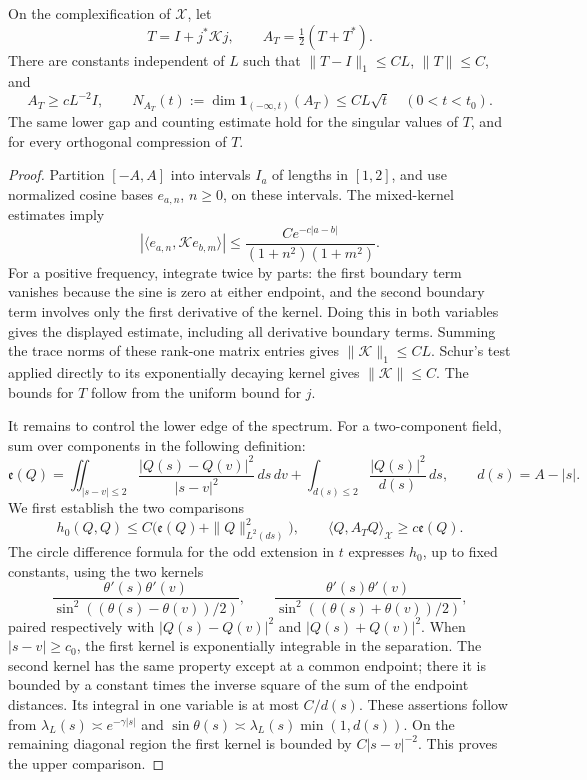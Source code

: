 \begin{lemma}\label{lem:03-spectral}\label{E:spectral-bounds}
On the complexification of \(\mathcal X\), let
\[
 T=I+j^*\mathscr K j,
 \qquad A_T=\tfrac12(T+T^*).
\]
There are constants independent of \(L\) such that
\(\|T-I\|_1\le CL\), \(\|T\|\le C\), and
\begin{equation}
 A_T\ge cL^{-2}I,
 \qquad N_{A_T}(t):=\dim\mathbf1_{(-\infty,t)}(A_T)
       \le CL\sqrt t\quad(0<t<t_0).
 \label{eq:G-8}
\end{equation}
The same lower gap and counting estimate hold for the singular values of
\(T\), and for every orthogonal compression of \(T\).
\end{lemma}
\begin{proof}
Partition \([-A,A]\) into intervals \(I_a\) of lengths in \([1,2]\),
and use normalized cosine bases \(e_{a,n}\), \(n\ge0\), on these intervals.
The mixed-kernel estimates imply
\[
 \left|\big\langle e_{a,n},\mathscr K e_{b,m}\big\rangle\right|
 \le \frac{Ce^{-c|a-b|}}{(1+n^2)(1+m^2)}.
\]
For a positive frequency, integrate twice by parts: the first boundary
term vanishes because the sine is zero at either endpoint, and the
second boundary term involves only the first derivative of the kernel.
Doing this in both variables gives the displayed estimate, including
all derivative boundary terms. Summing the trace norms of these
rank-one matrix entries gives
\(\|\mathscr K\|_1\le CL\). Schur's test applied directly to its
exponentially decaying kernel gives \(\|\mathscr K\|\le C\).
The bounds for \(T\) follow from the uniform bound for \(j\).

It remains to control the lower edge of the spectrum. For a two-component
field, sum over components in the following definition:
\[
 \mathfrak e(Q)=
 \iint_{|s-v|\le2}\frac{|Q(s)-Q(v)|^2}{|s-v|^2}\,ds\,dv
 +\int_{d(s)\le2}\frac{|Q(s)|^2}{d(s)}\,ds,
 \qquad d(s)=A-|s|.
\]
We first establish the two comparisons
\[
 h_0(Q,Q)\le C\bigl(\mathfrak e(Q)+\|Q\|_{L^2(ds)}^2\bigr),
 \qquad \langle Q,A_TQ\rangle_{\mathcal X}\ge c\mathfrak e(Q).
\]
The circle difference formula for the odd extension in \(t\) expresses
\(h_0\), up to fixed constants, using the two kernels
\[
 \frac{\theta'(s)\theta'(v)}
      {\sin^2((\theta(s)-\theta(v))/2)},\qquad
 \frac{\theta'(s)\theta'(v)}
      {\sin^2((\theta(s)+\theta(v))/2)},
\]
paired respectively with \(|Q(s)-Q(v)|^2\) and \(|Q(s)+Q(v)|^2\).
When \(|s-v|\ge c_0\), the first kernel is exponentially integrable
in the separation. The second kernel has the same property except at
a common endpoint; there it is bounded by a constant times the inverse
square of the sum of the endpoint distances. Its integral in one
variable is at most \(C/d(s)\). These assertions follow from
\(\lambda_L(s)\asymp e^{-\gamma|s|}\) and
\(\sin\theta(s)\asymp\lambda_L(s)\min(1,d(s))\).
On the remaining diagonal region the first kernel is bounded by
\(C|s-v|^{-2}\). This proves the upper comparison.


\end{proof}
